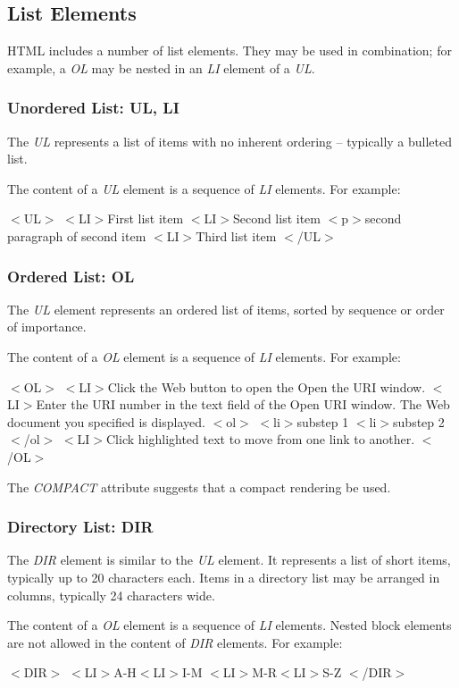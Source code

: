 \subsection*{List Elements}\par 
HTML includes a number of list elements.  They may be used in
combination;  for example, a {\it OL} may be nested in an {\it LI}
element of a {\it UL}.
\par \subsubsection*{Unordered List:  UL, LI}\par 
The {\it UL} represents a list of items with no inherent ordering
-- typically a bulleted list.
\par \par 
The content of a {\it UL} element is a sequence of {\it LI}
elements.  For example:
\par $<$UL$>$
$<$LI$>$First list item
$<$LI$>$Second list item
 $<$p$>$second paragraph of second item
$<$LI$>$Third list item
$<$/UL$>$
\subsubsection*{Ordered List:  OL}\par 
The {\it UL} element represents an ordered list of items, sorted by
sequence or order of importance.
\par \par 
The content of a {\it OL} element is a sequence of {\it LI}
elements.  For example:
\par $<$OL$>$
$<$LI$>$Click the Web button to open the Open the URI window.
$<$LI$>$Enter the URI number in the text field of the Open URI 
window. The Web document you specified is displayed.
  $<$ol$>$
   $<$li$>$substep 1
   $<$li$>$substep 2
  $<$/ol$>$
$<$LI$>$Click highlighted text to move from one link to another.
$<$/OL$>$
\par 
The {\it COMPACT} attribute suggests that a compact rendering be
used.
\par \subsubsection*{Directory List:  DIR}\par 
The {\it DIR} element is similar to the {\it UL} element.  It
represents a list of short items, typically up to 20 characters
each.  Items in a directory list may be arranged in columns, typically
24 characters wide.
\par \par 
The content of a {\it OL} element is a sequence of {\it LI}
elements.  Nested block elements are not allowed in the content of
{\it DIR} elements.  For example:
\par $<$DIR$>$
$<$LI$>$A-H$<$LI$>$I-M
$<$LI$>$M-R$<$LI$>$S-Z
$<$/DIR$>$

